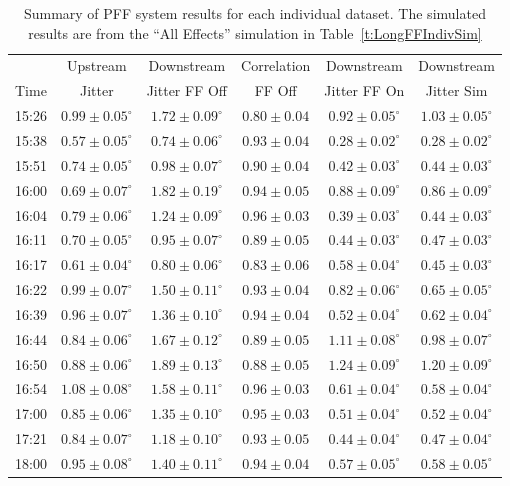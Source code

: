\begin{table}
  \begin{center}
    \begin{tabular}{| c  c  c  c  c  c  |}
	   \hline
	           & Upstream  & Downstream & Correlation  & Downstream  & Downstream  \\
       Time & Jitter &  Jitter FF Off &  FF Off &  Jitter FF On &  Jitter Sim \\ \hline
15:26 & \(0.99\pm0.05^\circ\) & \(1.72\pm0.09^\circ\) & \(0.80\pm0.04\) & \(0.92\pm0.05^\circ\) & \(1.03\pm0.05^\circ\) \\
15:38 & \(0.57\pm0.05^\circ\) & \(0.74\pm0.06^\circ\) & \(0.93\pm0.04\) & \(0.28\pm0.02^\circ\) & \(0.28\pm0.02^\circ\) \\
15:51 & \(0.74\pm0.05^\circ\) & \(0.98\pm0.07^\circ\) & \(0.90\pm0.04\) & \(0.42\pm0.03^\circ\) & \(0.44\pm0.03^\circ\) \\
16:00 & \(0.69\pm0.07^\circ\) & \(1.82\pm0.19^\circ\) & \(0.94\pm0.05\) & \(0.88\pm0.09^\circ\) & \(0.86\pm0.09^\circ\) \\
16:04 & \(0.79\pm0.06^\circ\) & \(1.24\pm0.09^\circ\) & \(0.96\pm0.03\) & \(0.39\pm0.03^\circ\) & \(0.44\pm0.03^\circ\) \\
16:11 & \(0.70\pm0.05^\circ\) & \(0.95\pm0.07^\circ\) & \(0.89\pm0.05\) & \(0.44\pm0.03^\circ\) & \(0.47\pm0.03^\circ\) \\
16:17 & \(0.61\pm0.04^\circ\) & \(0.80\pm0.06^\circ\) & \(0.83\pm0.06\) & \(0.58\pm0.04^\circ\) & \(0.45\pm0.03^\circ\) \\
16:22 & \(0.99\pm0.07^\circ\) & \(1.50\pm0.11^\circ\) & \(0.93\pm0.04\) & \(0.82\pm0.06^\circ\) & \(0.65\pm0.05^\circ\) \\
16:39 & \(0.96\pm0.07^\circ\) & \(1.36\pm0.10^\circ\) & \(0.94\pm0.04\) & \(0.52\pm0.04^\circ\) & \(0.62\pm0.04^\circ\) \\
16:44 & \(0.84\pm0.06^\circ\) & \(1.67\pm0.12^\circ\) & \(0.89\pm0.05\) & \(1.11\pm0.08^\circ\) & \(0.98\pm0.07^\circ\) \\
16:50 & \(0.88\pm0.06^\circ\) & \(1.89\pm0.13^\circ\) & \(0.88\pm0.05\) & \(1.24\pm0.09^\circ\) & \(1.20\pm0.09^\circ\) \\
16:54 & \(1.08\pm0.08^\circ\) & \(1.58\pm0.11^\circ\) & \(0.96\pm0.03\) & \(0.61\pm0.04^\circ\) & \(0.58\pm0.04^\circ\) \\
17:00 & \(0.85\pm0.06^\circ\) & \(1.35\pm0.10^\circ\) & \(0.95\pm0.03\) & \(0.51\pm0.04^\circ\) & \(0.52\pm0.04^\circ\) \\
17:21 & \(0.84\pm0.07^\circ\) & \(1.18\pm0.10^\circ\) & \(0.93\pm0.05\) & \(0.44\pm0.04^\circ\) & \(0.47\pm0.04^\circ\) \\
18:00 & \(0.95\pm0.08^\circ\) & \(1.40\pm0.11^\circ\) & \(0.94\pm0.04\) & \(0.57\pm0.05^\circ\) & \(0.58\pm0.05^\circ\) \\ \hline
    \end{tabular}
    \caption{Summary of PFF system results for each individual dataset. The simulated results are from the ``All Effects'' simulation in Table~\ref{t:LongFFIndivSim}}
  	\label{t:LongFFIndiv}
  \end{center}
\end{table}

